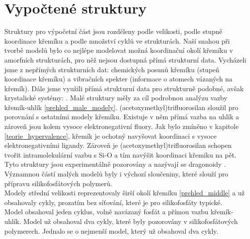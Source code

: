 \documentclass[
  digital, %
  table,   %
  lof,     %
  lot,     %
  oneside,
]{fithesis3}
\begin{document}
\section{Vypočtené struktury}
Struktury pro výpočetní část jsou rozděleny podle velikosti, podle stupně koordinace křemíku a podle množství cyklů ve strukturách. Naší snahou při tvorbě modelů bylo co nejlépe modelovat možná koordinační okolí křemíku v amorfních strukturách, pro něž nejsou dostupná přímá strukturní data. Vycházeli jsme z nepřímých strukturních dat: chemických posunů křemíku (stupeň koordinace křemíku) a vibračních spekter (informace o atomech vázaných na křemík). Dále jsme využili přímá strukturní data pro strukturně podobné, avšak krystalické systémy: \cite{C3NJ00721A} \cite{rtg_4_pinkas}. Malé struktury měly za cíl podrobnou analýzu vazby křemík-uhlík \ref{prehled_male_modely}. (acetoxymethyl)trifluorosilan sloužil pro porovnání s ostatními modely křemíku. Existuje v něm přímá vazba na uhlík a zároveň jsou kolem vysoce elektronegativní fluory. Jak bylo zmíněno v kapitole \ref{teorie_hypervalence}, křemík je ochotný navyšovat koordinaci s vysoce elektronegativními ligandy. Zároveň je (acetoxymethyl)trifluorosilan schopen tvořit intramolekulární vazbu s Si-O a tím navýšit koordinaci křemíku na pět. Tyto  struktury jsou experimentálně pozorovány a nazývají se dragonoidy \cite{Chipanina2011}. Významnou částí malých modelů byly i výchozí sloučeniny, které slouží pro přípravu silikofosfátových polymerů.\\
Modely střední velikosti reprezentovaly širší okolí křemíku \ref{prehled_middle} a už obsahovaly cykly, prozatím bez síťování, které je pro silikofosfáty typické. \\
Model  obsahoval jeden cyklus, volně navázaný fosfát a přímou vazbu křemík-uhlík. Model  už obsahoval dva cykly, které byly pozorovány v silikofosfátových polymerech. Jednalo se o nejmenší model, který už obsahoval dva cykly.\\
\end{document}
